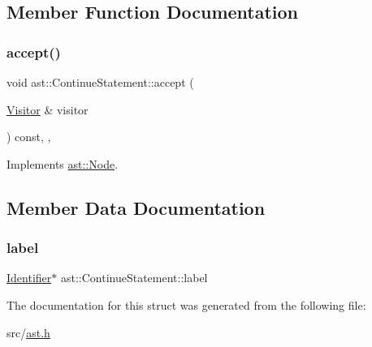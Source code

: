 \subsection{Member Function Documentation}
\mbox{\label{structast_1_1_continue_statement_a60101cc01b95c4fab4edb2adf7cb70f3}} 
\subsubsection{\texorpdfstring{accept()}{accept()}}
{\footnotesize\ttfamily void ast\+::\+Continue\+Statement\+::accept (\begin{DoxyParamCaption}\item[{\hyperlink{structast_1_1_visitor}{Visitor} \&}]{visitor }\end{DoxyParamCaption}) const\hspace{0.3cm}{\ttfamily [inline]}, {\ttfamily [override]}, {\ttfamily [virtual]}}



Implements \hyperlink{structast_1_1_node_abc089ee6caaf06a4445ebdd8391fdebc}{ast\+::\+Node}.



\subsection{Member Data Documentation}
\mbox{\label{structast_1_1_continue_statement_ad9bea443914e61a2f69861d7f45e17bc}} 
\subsubsection{\texorpdfstring{label}{label}}
{\footnotesize\ttfamily \hyperlink{structast_1_1_identifier}{Identifier}$\ast$ ast\+::\+Continue\+Statement\+::label}



The documentation for this struct was generated from the following file\+:\begin{DoxyCompactItemize}
\item 
src/\hyperlink{ast_8h}{ast.\+h}\end{DoxyCompactItemize}
